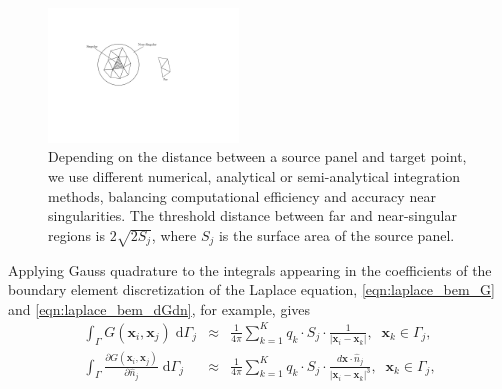 \documentclass[final,3p,times]{elsarticle}
\newcommand{\di}[1]{\text{d}#1}
\newcommand{\partiald}[2]{\frac{\partial #1}{\partial #2}}
\newcommand{\nhat}{\hat{n}}
\newcommand{\vect}[1]{\mathbf{#1}}
\begin{document}
\begin{figure}[t]
	\begin{centering}
\includegraphics[natwidth=5.15in,natheight=2.6in,width=0.45\textwidth]{IntegrationDomain.pdf}
	\caption{Depending on the distance between a source panel and target point, we use different numerical, analytical or semi-analytical integration methods, balancing computational efficiency and accuracy near singularities. The threshold distance between far and near-singular regions is $2\sqrt{2 S_j}$, where $S_j$ is the surface area of the source panel.}
	\label{fig:integration_domain}
	\end{centering}
\end{figure}



Applying Gauss quadrature to the integrals appearing in the coefficients of the boundary element discretization of the Laplace equation, \eqref{eqn:laplace_bem_G} and \eqref{eqn:laplace_bem_dGdn}, for example, gives
%
\begin{eqnarray}
	\label{eqn:gauss:1st-kind}
	\int_{\Gamma} G(\vect{x}_i,\vect{x}_j)\;\di{\Gamma_j} & \approx & \frac{1}{4\pi} \sum_{k=1}^{K} q_k\cdot S_j\cdot \frac{1}{|\vect{x}_i-\vect{x}_k|},\;\;\vect{x}_k \in \Gamma_j, \\ 
	\label{eqn:gauss:2nd-kind}
	\int_{\Gamma} \partiald{G(\vect{x}_i,\vect{x}_j)}{\nhat_j}\;\di{\Gamma_j} & \approx & \frac{1}{4\pi} \sum_{k=1}^{K}q_k\cdot S_j\cdot \frac{d\vect{x}\cdot\nhat_j}{|\vect{x}_i-\vect{x}_k|^{3}},\;\;\vect{x}_k \in \Gamma_j,
\end{eqnarray}
\end{document}
